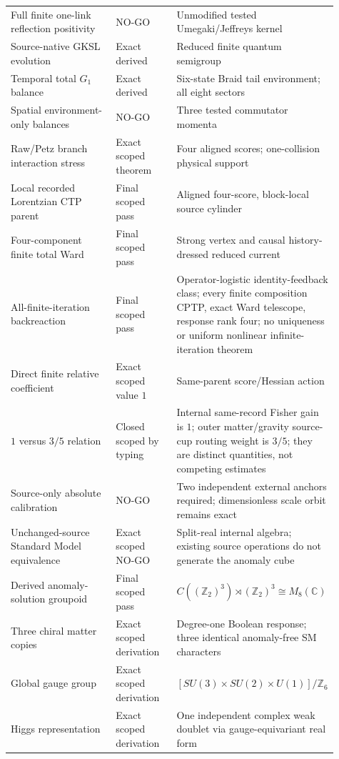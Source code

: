 \documentclass[11pt]{article}
\theoremstyle{definition}
\theoremstyle{remark}
\begin{document}
\begin{longtable}{>{\raggedright\arraybackslash}p{0.34\linewidth} >{\raggedright\arraybackslash}p{0.19\linewidth} >{\raggedright\arraybackslash}p{0.38\linewidth}}
Full finite one-link reflection positivity & NO-GO & Unmodified tested Umegaki/Jeffreys kernel \\
Source-native GKSL evolution & Exact derived & Reduced finite quantum semigroup \\
Temporal total $G_1$ balance & Exact derived & Six-state Braid tail environment; all eight sectors \\
Spatial environment-only balances & NO-GO & Three tested commutator momenta \\
Raw/Petz branch interaction stress & Exact scoped theorem & Four aligned scores; one-collision physical support \\
Local recorded Lorentzian CTP parent & Final scoped pass & Aligned four-score, block-local source cylinder \\
Four-component finite total Ward & Final scoped pass & Strong vertex and causal history-dressed reduced current \\
All-finite-iteration backreaction & Final scoped pass & Operator-logistic identity-feedback class; every finite composition CPTP, exact Ward telescope, response rank four; no uniqueness or uniform nonlinear infinite-iteration theorem \\
Direct finite relative coefficient & Exact scoped value $1$ & Same-parent score/Hessian action \\
$1$ versus $3/5$ relation & Closed scoped by typing & Internal same-record Fisher gain is $1$; outer matter/gravity source-cup routing weight is $3/5$; they are distinct quantities, not competing estimates \\
Source-only absolute calibration & NO-GO & Two independent external anchors required; dimensionless scale orbit remains exact \\
Unchanged-source Standard Model equivalence & Exact scoped NO-GO & Split-real internal algebra; existing source operations do not generate the anomaly cube \\
Derived anomaly-solution groupoid & Final scoped pass & $C((\mathbb Z_2)^3)\rtimes(\mathbb Z_2)^3\cong M_8(\mathbb C)$ \\
Three chiral matter copies & Exact scoped derivation & Degree-one Boolean response; three identical anomaly-free SM characters \\
Global gauge group & Exact scoped derivation & $[SU(3)\times SU(2)\times U(1)]/\mathbb Z_6$ \\
Higgs representation & Exact scoped derivation & One independent complex weak doublet via gauge-equivariant real form \\

\end{longtable}
\end{document}
